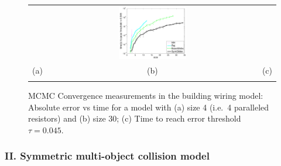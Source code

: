 \documentclass[]{article}
\newcommand{\nnn}{0.33}
\newcommand{\nnh}{0.23}
\begin{document}
\begin{figure}[t!]
\begin{center}
\begin{tabular}{ccc}
& \hspace{-3mm} \includegraphics[width=\nnn\textwidth, height=\nnh\textwidth]{plotsx/conductancex/time_vs_param-errorbar.pdf}
\vspace{-1.5mm}
\\
\hspace{-5mm} \footnotesize(a) 
& \hspace{-4mm} \footnotesize(b) 
& \hspace{-3mm} \footnotesize(c) \\
\multicolumn{3}{c}{}
\end{tabular}
\end{center}
\vspace{-8mm}
\caption{\footnotesize 
MCMC Convergence measurements in the building wiring model: 
Absolute error vs time for a model with (a) size 4 (i.e.\ 4 paralleled resistors) and (b) size 30; (c) Time to reach error threshold $\tau=0.045$.}
\label{fig:resistor}
\vspace{-4mm}
\end{figure}




\subsubsection*{II. Symmetric multi-object collision model} %

\end{document}
